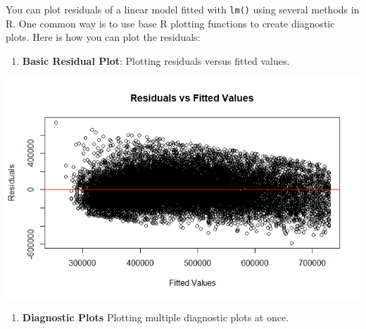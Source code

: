 \documentclass[
]{book}
\newenvironment{Shaded}{\begin{snugshade}}{\end{snugshade}}
\newcommand{\AttributeTok}[1]{\textcolor[rgb]{0.13,0.29,0.53}{#1}}
\newcommand{\CommentTok}[1]{\textcolor[rgb]{0.56,0.35,0.01}{\textit{#1}}}
\newcommand{\DecValTok}[1]{\textcolor[rgb]{0.00,0.00,0.81}{#1}}
\newcommand{\FunctionTok}[1]{\textcolor[rgb]{0.13,0.29,0.53}{\textbf{#1}}}
\newcommand{\NormalTok}[1]{#1}
\newcommand{\OtherTok}[1]{\textcolor[rgb]{0.56,0.35,0.01}{#1}}
\newcommand{\SpecialCharTok}[1]{\textcolor[rgb]{0.81,0.36,0.00}{\textbf{#1}}}
\newcommand{\StringTok}[1]{\textcolor[rgb]{0.31,0.60,0.02}{#1}}
\providecommand{\tightlist}{%
  \setlength{\itemsep}{0pt}\setlength{\parskip}{0pt}}
\begin{document}
You can plot residuals of a linear model fitted with \texttt{lm()} using several methods in R. One common way is to use base R plotting functions to create diagnostic plots. Here is how you can plot the residuals:

\begin{enumerate}
\def\labelenumi{\arabic{enumi}.}
\tightlist
\item
  \textbf{Basic Residual Plot}: Plotting residuals versus fitted values.
\end{enumerate}

\begin{Shaded}
\end{Shaded}

\includegraphics{images/residual_plot.PNG}

\begin{enumerate}
\def\labelenumi{\arabic{enumi}.}
\setcounter{enumi}{1}
\tightlist
\item
  \textbf{Diagnostic Plots} Plotting multiple diagnostic plots at once.
\end{enumerate}
\end{document}
